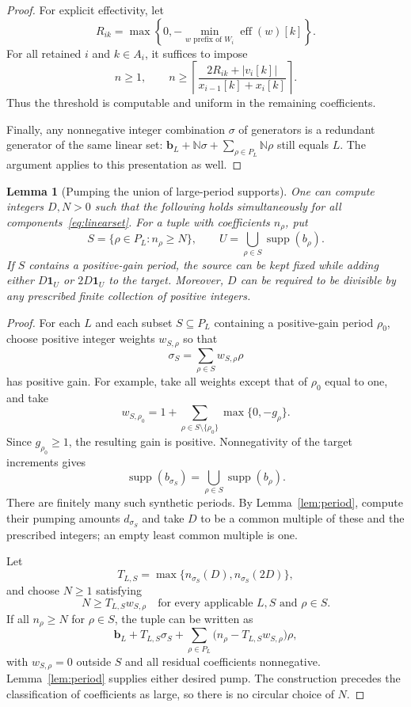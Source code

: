 \documentclass[11pt,a4paper]{article}
\newtheorem{lemma}[theorem]{Lemma}
\theoremstyle{remark}
\newcommand{\N}{\mathbb N}
\newcommand{\supp}{\operatorname{supp}}
\newcommand{\eff}{\operatorname{eff}}
\newcommand{\one}{\mathbf 1}
\begin{document}
\begin{proof}
For explicit effectivity, let
\[
 R_{ik}=\max\left\{0,-\min_{w\text{ prefix of }W_i}\eff(w)[k]\right\}.
\]
For all retained $i$ and $k\in A_i$, it suffices to impose
\begin{equation}\label{eq:threshold}
 n\ge1,\qquad
 n\ge\left\lceil\frac{2R_{ik}+|v_i[k]|}{x_{i-1}[k]+x_i[k]}\right\rceil.
\end{equation}
Thus the threshold is computable and uniform in the remaining coefficients.

Finally, any nonnegative integer combination $\sigma$ of generators is a redundant generator of the same linear set: $\mathbf b_L+\N\sigma+\sum_{\rho\in P_L}\N\rho$ still equals $L$. The argument applies to this presentation as well.
\end{proof}

\begin{lemma}[Pumping the union of large-period supports]\label{lem:union}
One can compute integers $D,N>0$ such that the following holds simultaneously for all components~\eqref{eq:linearset}. For a tuple with coefficients $n_\rho$, put
\[
 S=\{\rho\in P_L:n_\rho\ge N\},\qquad
 U=\bigcup_{\rho\in S}\supp(b_\rho).
\]
If $S$ contains a positive-gain period, the source can be kept fixed while adding either $D\one_U$ or $2D\one_U$ to the target. Moreover, $D$ can be required to be divisible by any prescribed finite collection of positive integers.
\end{lemma}

\begin{proof}
For each $L$ and each subset $S\subseteq P_L$ containing a positive-gain period $\rho_0$, choose positive integer weights $w_{S,\rho}$ so that
\[
 \sigma_S=\sum_{\rho\in S}w_{S,\rho}\rho
\]
has positive gain. For example, take all weights except that of $\rho_0$ equal to one, and take
\[
 w_{S,\rho_0}=1+\sum_{\rho\in S\setminus\{\rho_0\}}\max\{0,-g_\rho\}.
\]
Since $g_{\rho_0}\ge1$, the resulting gain is positive. Nonnegativity of the target increments gives
\[
 \supp(b_{\sigma_S})=\bigcup_{\rho\in S}\supp(b_\rho).
\]
There are finitely many such synthetic periods. By Lemma~\ref{lem:period}, compute their pumping amounts $d_{\sigma_S}$ and take $D$ to be a common multiple of these and the prescribed integers; an empty least common multiple is one.

Let
\[
 T_{L,S}=\max\{n_{\sigma_S}(D),n_{\sigma_S}(2D)\},
\]
and choose $N\ge1$ satisfying
\begin{equation}\label{eq:N}
 N\ge T_{L,S}w_{S,\rho}
 \quad\text{for every applicable }L,S\text{ and }\rho\in S.
\end{equation}
If all $n_\rho\ge N$ for $\rho\in S$, the tuple can be written as
\[
 \mathbf b_L+T_{L,S}\sigma_S+
 \sum_{\rho\in P_L}\bigl(n_\rho-T_{L,S}w_{S,\rho}\bigr)\rho,
\]
with $w_{S,\rho}=0$ outside $S$ and all residual coefficients nonnegative. Lemma~\ref{lem:period} supplies either desired pump. The construction precedes the classification of coefficients as large, so there is no circular choice of $N$.
\end{proof}
\end{document}

